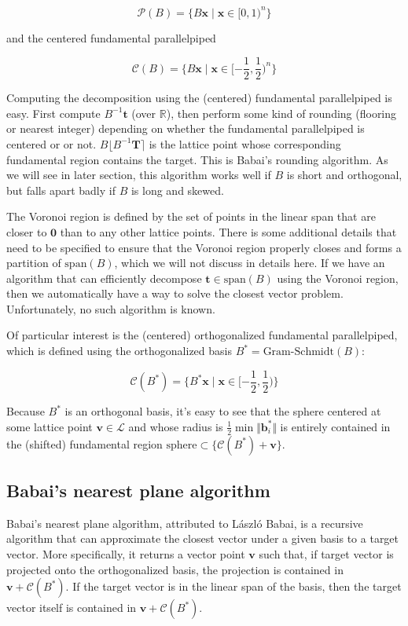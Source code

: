 $$
\mathcal{P}(B) = \{B\mathbf{x} \mid \mathbf{x} \in [0, 1)^n\}
$$

and the centered fundamental parallelpiped

$$
\mathcal{C}(B) = \{B\mathbf{x} \mid \mathbf{x} \in [-\frac{1}{2}, \frac{1}{2})^n\}
$$

Computing the decomposition using the (centered) fundamental parallelpiped is easy. First compute $B^{-1}\mathbf{t}$ (over $\mathbb{R}$), then perform some kind of rounding (flooring or nearest integer) depending on whether the fundamental parallelpiped is centered or or not. $B\lfloor B^{-1}\mathbf{T} \rceil$ is the lattice point whose corresponding fundamental region contains the target. This is Babai's rounding algorithm. As we will see in later section, this algorithm works well if $B$ is short and orthogonal, but falls apart badly if $B$ is long and skewed.

The Voronoi region is defined by the set of points in the linear span that are closer to $\mathbf{0}$ than to any other lattice points. There is some additional details that need to be specified to ensure that the Voronoi region properly closes and forms a partition of $\text{span}(B)$, which we will not discuss in details here. If we have an algorithm that can efficiently decompose $\mathbf{t} \in \text{span}(B)$ using the Voronoi region, then we automatically have a way to solve the closest vector problem. Unfortunately, no such algorithm is known.

Of particular interest is the (centered) orthogonalized fundamental parallelpiped, which is defined using the orthogonalized basis $B^\ast = \text{Gram-Schmidt}(B)$:

$$
\mathcal{C}(B^\ast) = \{B^\ast\mathbf{x} \mid \mathbf{x} \in [-\frac{1}{2}, \frac{1}{2})\}
$$

Because $B^\ast$ is an orthogonal basis, it's easy to see that the sphere centered at some lattice point $\mathbf{v} \in \mathcal{L}$ and whose radius is $\frac{1}{2}\min \Vert \mathbf{b}_i^\ast\Vert$ is entirely contained in the (shifted) fundamental region $\text{sphere} \subset \{\mathcal{C}(B^\ast) + \mathbf{v}\}$.

\subsection{Babai's nearest plane algorithm}
Babai's nearest plane algorithm, attributed to László Babai, is a recursive algorithm that can approximate the closest vector under a given basis to a target vector. More specifically, it returns a vector point $\mathbf{v}$ such that, if target vector is projected onto the orthogonalized basis, the projection is contained in $\mathbf{v} + \mathcal{C}(B^\ast)$. If the target vector is in the linear span of the basis, then the target vector itself is contained in $\mathbf{v} + \mathcal{C}(B^\ast)$.

